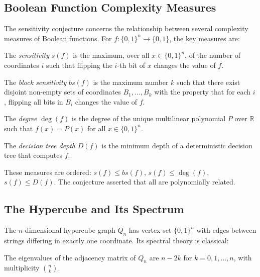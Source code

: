 \subsection{Boolean Function Complexity Measures}

The sensitivity conjecture concerns the relationship between several complexity measures of Boolean functions. For $f: \{0,1\}^n \to \{0,1\}$, the key measures are:

\begin{definition}[Sensitivity]
The \emph{sensitivity} $s(f)$ is the maximum, over all $x \in \{0,1\}^n$, of the number of coordinates $i$ such that flipping the $i$-th bit of $x$ changes the value of $f$.
\end{definition}

\begin{definition}
The \emph{block sensitivity} $bs(f)$ is the maximum number $k$ such that there exist disjoint non-empty sets of coordinates $B_1, \ldots, B_k$ with the property that for each $i$, flipping all bits in $B_i$ changes the value of $f$.
\end{definition}

\begin{definition}[Degree]
The \emph{degree} $\deg(f)$ is the degree of the unique multilinear polynomial $P$ over $\mathbb{R}$ such that $f(x) = P(x)$ for all $x \in \{0,1\}^n$.
\end{definition}

\begin{definition}
The \emph{decision tree depth} $D(f)$ is the minimum depth of a deterministic decision tree that computes $f$.
\end{definition}

These measures are ordered: $s(f) \le bs(f)$, $s(f) \le \deg(f)$, $s(f) \le D(f)$. The conjecture asserted that all are polynomially related.

\subsection{The Hypercube and Its Spectrum}

The $n$-dimensional hypercube graph $Q_n$ has vertex set $\{0,1\}^n$ with edges between strings differing in exactly one coordinate. Its spectral theory is classical:

\begin{fact}
The eigenvalues of the adjacency matrix of $Q_n$ are $n - 2k$ for $k = 0, 1, \ldots, n$, with multiplicity $\binom{n}{k}$.
\end{fact}

